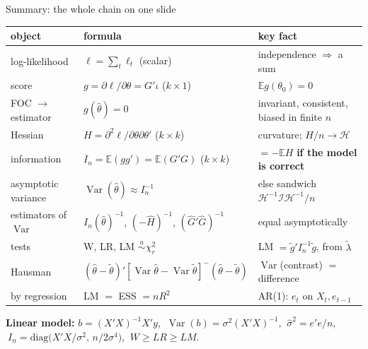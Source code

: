 \documentclass[aspectratio=169,11pt,t]{beamer}
\newcommand{\E}{\mathbb{E}}
\DeclareMathOperator{\Var}{Var}
\newcommand{\cI}{\mathcal{I}}          %
\newcommand{\In}{I_{n}}                %
\newcommand{\cH}{\mathcal{H}}          %
\newcommand{\hth}{\hat\theta}
\newcommand{\tth}{\tilde\theta}
\newcommand{\thz}{\theta_{0}}
\newcommand{\asim}{\overset{a}{\sim}}
\begin{document}
\begin{frame}{Summary: the whole chain on one slide}
\footnotesize
\renewcommand{\arraystretch}{1.3}
\begin{tabular}{@{}lll@{}}
 \textbf{object} & \textbf{formula} & \textbf{key fact}\\ \hline
 log-likelihood & $\ell=\sum_{t}\ell_{t}$ (scalar) & independence $\Rightarrow$ a sum\\
 score & $g=\partial\ell/\partial\theta=G'\iota$ ($k\times1$) & $\E g(\thz)=0$\\
 FOC $\to$ estimator & $g(\hth)=0$ & invariant, consistent, biased in finite $n$\\
 Hessian & $H=\partial^{2}\ell/\partial\theta\partial\theta'$ ($k\times k$) & curvature; $H/n\to\cH$\\
 information & $\In=\E(gg')=\E(G'G)$ ($k\times k$) & $=-\E H$ \textbf{if the model is correct}\\
 asymptotic variance & $\Var(\hth)\approx\In^{-1}$ & else sandwich $\cH^{-1}\cI\cH^{-1}/n$\\
 estimators of $\Var$ & $\In(\hth)^{-1}$, $(-\hat H)^{-1}$, $(\hat G'\hat G)^{-1}$ & equal asymptotically\\
 tests & W, LR, LM $\asim\chi^{2}_{r}$ & LM $=\tilde g'\In^{-1}\tilde g$, from $\tilde\lambda$\\
 Hausman & $(\hth-\tth)'[\Var\hth-\Var\tth]^{-}(\hth-\tth)$ & $\Var$(contrast) $=$ difference\\
 by regression & LM $=$ ESS $=nR^{2}$ & AR(1): $e_{t}$ on $X_{t},e_{t-1}$
\end{tabular}

\vspace{4pt}
\textbf{Linear model:} $b=(X'X)^{-1}X'y$, $\ \Var(b)=\sigma^{2}(X'X)^{-1}$, $\ \hat\sigma^{2}=e'e/n$, $\ \In=\mathrm{diag}\bigl(X'X/\sigma^{2},\,n/2\sigma^{4}\bigr)$, $\ W\ge LR\ge LM$.
\end{frame}
\end{document}
